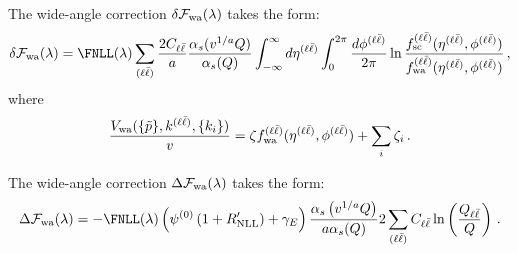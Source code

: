The wide-angle correction $\delta\mathcal{F}_{\rm wa}(\lambda)$ takes the form:
\begin{equation}
 \label{eq:dFwa-general-add}
	\delta\mathcal{F}_{\rm wa}(\lambda)=\FNLL(\lambda)
	\sum_{(\ell\bar\ell)}\frac{2C_{\ell\bar\ell}}{a}\frac{\alpha_s(v^{1/a}Q)}{\alpha_s(Q)}\int_{-\infty}^{\infty}d\eta^{(\ell\bar\ell)}\int_0^{2\pi}\frac{d\phi^{(\ell\bar\ell)}}{2\pi}\ln\frac{f_{\rm sc}^{(\ell\bar\ell)}(\eta^{(\ell\bar\ell)},\phi^{(\ell\bar\ell)})}{f_{\rm wa}^{(\ell\bar\ell)}(\eta^{(\ell\bar\ell)},\phi^{(\ell\bar\ell)})}\,,
\end{equation}
where
\begin{equation}
	\frac{V_{\rm wa}(\{\tilde{p}\},k^{(\ell\bar\ell)},\{k_i\})}{v}=\zeta f_{\rm wa}^{(\ell\bar\ell)}(\eta^{(\ell\bar\ell)},\phi^{(\ell\bar\ell)})+\sum_i\zeta_i\,.
\end{equation}

The wide-angle correction $\Delta\mathcal{F}_{\rm wa}(\lambda)$ takes the form:
 \begin{equation}
 \label{eq:DFwa-general-add}
 	\Delta\mathcal{F}_{\mathrm{wa}}(\lambda)=-\FNLL(\lambda)\left(\psi^{(0)}\left(1+R'_{\mathrm{NLL}}\right)+\gamma_E\right)\frac{\alpha_s\left(v^{1/a}Q\right)}{a\alpha_s(Q)}2\sum_{(\ell\bar\ell)}C_{\ell\bar\ell}\ln\left(\frac{Q_{\ell\bar\ell}}{Q}\right)\,.
 \end{equation}
